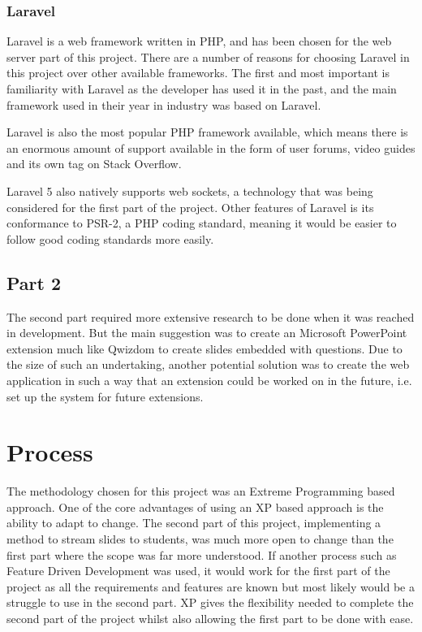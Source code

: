 \subsubsection{Laravel}
Laravel is a web framework written in PHP, and has been chosen for the web server part of this project\cite{laravel}. There are a number of reasons for choosing Laravel in this project over other available frameworks. The first and most important is familiarity with Laravel as the developer has used it in the past, and the main framework used in their year in industry was based on Laravel.

Laravel is also the most popular PHP framework available\cite{PopularPHPFrameworks}, which means there is an enormous amount of support available in the form of user forums, video guides and its own tag on Stack Overflow.

Laravel 5 also natively supports web sockets, a technology that was being considered for the first part of the project. Other features of Laravel is its conformance to PSR-2, a PHP coding standard, meaning it would be easier to follow good coding standards more easily.
\subsection{Part 2}
The second part required more extensive research to be done when it was reached in development. But the main suggestion was to create an Microsoft PowerPoint extension much like Qwizdom to create slides embedded with questions\cite{powerpoint-addins}. Due to the size of such an undertaking, another potential solution was to create the web application in such a way that an extension could be worked on in the future, i.e. set up the system for future extensions.

\section{Process}
The methodology chosen for this project was an Extreme Programming based approach. One of the core advantages of using an XP based approach is the ability to adapt to change. The second part of this project, implementing a method to stream slides to students, was much more open to change than the first part where the scope was far more understood. If another process such as Feature Driven Development was used, it would work for the first part of the project as all the requirements and features are known but most likely would be a struggle to use in the second part. XP gives the flexibility needed to complete the second part of the project whilst also allowing the first part to be done with ease.

